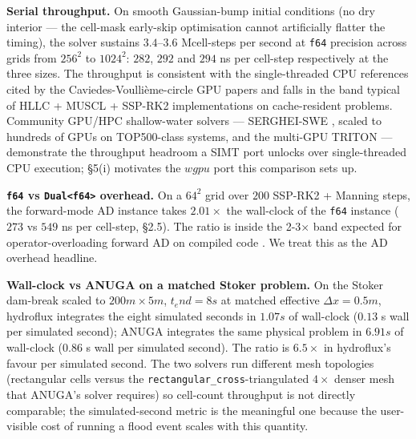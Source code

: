 \textbf{Serial throughput.} On smooth Gaussian-bump initial conditions
(no dry interior --- the cell-mask early-skip optimisation cannot
artificially flatter the timing), the solver sustains \(3.4\)--\(3.6\)
Mcell-steps per second at \texttt{f64} precision across grids from
\(256^{2}\) to \(1024^{2}\): \(282\), \(292\) and \(294\) ns per
cell-step respectively at the three sizes. The throughput is consistent
with the single-threaded CPU references cited by the
Caviedes-Voullième-circle GPU papers \citep{Rak2024, SaleemNorman2024}
and falls in the band typical of HLLC + MUSCL + SSP-RK2 implementations
on cache-resident problems. Community GPU/HPC shallow-water solvers ---
SERGHEI-SWE \citep{CaviedesVoullieme2023SERGHEI}, scaled to hundreds of
GPUs on TOP500-class systems, and the multi-GPU TRITON
\citep{MoralesHernandez2021TRITON} --- demonstrate the throughput
headroom a SIMT port unlocks over single-threaded CPU execution; §5(i)
motivates the \(wgpu\) port this comparison sets up.

\textbf{\texttt{f64} vs \texttt{Dual\textless{}f64\textgreater{}}
overhead.} On a \(64^{2}\) grid over \(200\) SSP-RK2 + Manning steps,
the forward-mode AD instance takes \(2.01 ×\) the wall-clock of the
\texttt{f64} instance (\(273\) vs \(549\) ns per cell-step, §2.5). The
ratio is inside the 2-3× band expected for operator-overloading forward
AD on compiled code \citep{Griewank2008, Sagebaum2019CoDiPack}. We treat
this as the AD overhead headline.

\textbf{Wall-clock vs ANUGA on a matched Stoker problem.} On the Stoker
dam-break scaled to \(200 m × 5 m\), \(t_end = 8 s\) at matched
effective \(\Delta x = 0.5 m\), hydroflux integrates the eight simulated
seconds in \(1.07 s\) of wall-clock (\(0.13\) s wall per simulated
second); ANUGA integrates the same physical problem in \(6.91 s\) of
wall-clock (\(0.86\) s wall per simulated second). The ratio is \(6.5×\)
in hydroflux's favour per simulated second. The two solvers run
different mesh topologies (rectangular cells versus the
\texttt{rectangular\_cross}-triangulated \(4 ×\) denser mesh that
ANUGA's solver requires) so cell-count throughput is not directly
comparable; the simulated-second metric is the meaningful one because
the user- visible cost of running a flood event scales with this
quantity.

